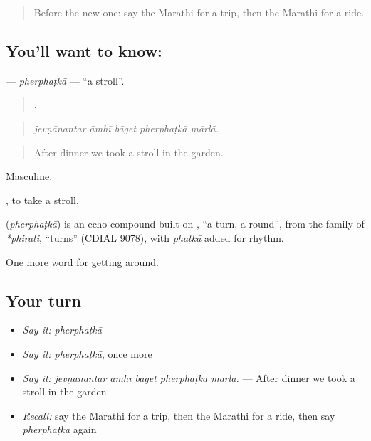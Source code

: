 \label{lesson:MR-C411-pherphatka}



\begin{quote}
Before the new one: say the Marathi for a trip, then the Marathi for a ride.
\end{quote}

\subsection*{You'll want to know: }
\textbf{} — \emph{pherphaṭkā} — \textquotedblleft{}a stroll\textquotedblright{}.

\begin{quote}
    .
\end{quote}

\begin{quote}
\emph{jevṇānantar āmhī bāget pherphaṭkā mārlā.}
\end{quote}

\begin{quote}
After dinner we took a stroll in the garden.
\end{quote}

Masculine.

 , to take a stroll.

\begin{cousinweb}
\textbf{} (\emph{pherphaṭkā}) is an echo compound built on \textbf{}, \textquotedblleft{}a turn, a round\textquotedblright{}, from the family of \emph{*phirati}, \textquotedblleft{}turns\textquotedblright{} (CDIAL 9078), with \emph{phaṭkā} added for rhythm.
\end{cousinweb}

\begin{grammarlens}[title={What you've built}]
One more word for getting around.
\end{grammarlens}

\subsection*{Your turn}
\begin{itemize}
\raggedright
  \item \emph{Say it:} \emph{pherphaṭkā}
  \item \emph{Say it:} \emph{pherphaṭkā}, once more
  \item \emph{Say it:} \emph{jevṇānantar āmhī bāget pherphaṭkā mārlā.} — After dinner we took a stroll in the garden.
  \item \emph{Recall:} say the Marathi for a trip, then the Marathi for a ride, then say \emph{pherphaṭkā} again
\end{itemize}

